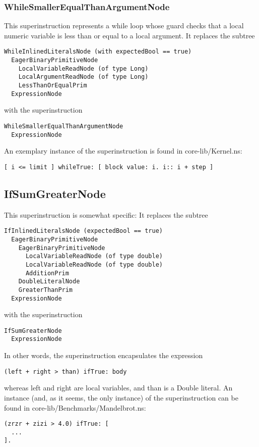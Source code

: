 \documentclass[10pt,a4paper]{article}
\begin{document}
\subsubsection{WhileSmallerEqualThanArgumentNode}

This superinstruction represents a \textsf{while} loop whose guard checks that a local numeric variable is less than or equal to a local argument. It replaces the subtree
\begin{verbatim}
WhileInlinedLiteralsNode (with expectedBool == true)
  EagerBinaryPrimitiveNode
    LocalVariableReadNode (of type Long)
    LocalArgumentReadNode (of type Long)
    LessThanOrEqualPrim
  ExpressionNode
\end{verbatim}
with the superinstruction
\begin{verbatim}
WhileSmallerEqualThanArgumentNode
  ExpressionNode
\end{verbatim}
An exemplary instance of the superinstruction is found in \textsf{core-lib/Kernel.ns}:
\begin{verbatim}
[ i <= limit ] whileTrue: [ block value: i. i:: i + step ]
\end{verbatim}

\subsection{IfSumGreaterNode}

This superinstruction is somewhat specific: It replaces the subtree
\begin{verbatim}
IfInlinedLiteralsNode (expectedBool == true)
  EagerBinaryPrimitiveNode
    EagerBinaryPrimitiveNode
      LocalVariableReadNode (of type double)
      LocalVariableReadNode (of type double)
      AdditionPrim
    DoubleLiteralNode
    GreaterThanPrim
  ExpressionNode
\end{verbatim}
with the superinstruction
\begin{verbatim}
IfSumGreaterNode
  ExpressionNode
\end{verbatim}
In other words, the superinstruction encapsulates the expression
\begin{verbatim}
(left + right > than) ifTrue: body
\end{verbatim}
whereas \textsf{left} and \textsf{right} are local variables, and \textsf{than} is a Double literal. An instance (and, as it seems, the only instance) of the superinstruction can be found in \textsf{core-lib/Benchmarks/Mandelbrot.ns}:
\begin{verbatim}
(zrzr + zizi > 4.0) ifTrue: [
  ...
].
\end{verbatim}
\end{document}
